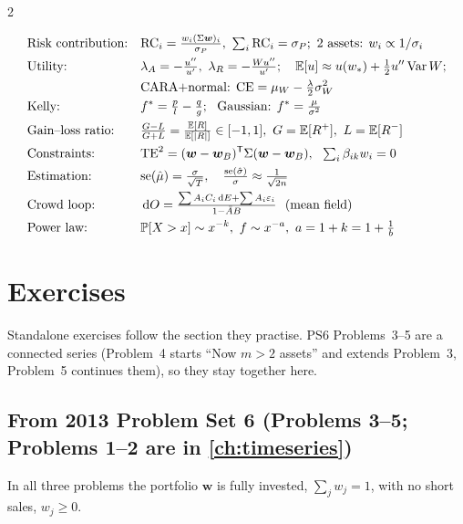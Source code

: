 \begin{paracol}{2}
\begin{keyformulas}
\begin{align*}
&\text{Risk contribution:} && \mathrm{RC}_i=\tfrac{w_i(\Sigma\bm w)_i}{\sigma_P},\ \textstyle\sum_i\mathrm{RC}_i=\sigma_P;\ \text{2 assets: }w_i\propto1/\sigma_i\\
&\text{Utility:} && \lambda_A=-\tfrac{u''}{u'},\ \lambda_R=-\tfrac{Wu''}{u'};\quad \E[u]\approx u(w_*)+\tfrac12u''\Var W;\\
& && \text{CARA+normal: CE}=\mu_W-\tfrac\lambda2\sigma_W^2\\
&\text{Kelly:} && f^*=\tfrac pl-\tfrac qg;\ \ \text{Gaussian: }f^*=\tfrac{\mu}{\sigma^2}\\
&\text{Gain--loss ratio:} && \tfrac{G-L}{G+L}=\tfrac{\E[R]}{\E[|R|]}\in[-1,1],\ G=\E[R^+],\ L=\E[R^-]\\
&\text{Constraints:} && \mathrm{TE}^2=(\bm w-\bm w_B)\T\Sigma(\bm w-\bm w_B),\ \ \textstyle\sum_i\beta_{ik}w_i=0\\
&\text{Estimation:} && \mathrm{se}(\hat\mu)=\tfrac\sigma{\sqrt T},\quad \tfrac{\mathrm{se}(\hat\sigma)}\sigma\approx\tfrac1{\sqrt{2n}}\\
&\text{Crowd loop:} && \dd O=\tfrac{\sum A_iC_i\dd E+\sum A_i\varepsilon_i}{1-\bar AB}\ \ (\text{mean field})\\
&\text{Power law:} && \Prob[X>x]\sim x^{-k},\ f\sim x^{-a},\ a=1+k=1+\tfrac1b
\end{align*}
\end{keyformulas}

\section*{Exercises}
Standalone exercises follow the section they practise. PS6 Problems~3--5 are a connected series (Problem~4 starts ``Now $m>2$ assets'' and extends Problem~3, Problem~5 continues them), so they stay together here.

\subsection*{From 2013 Problem Set 6 (Problems 3--5; Problems 1--2 are in \cref{ch:timeseries})}
In all three problems the portfolio $\bm w$ is fully invested, $\sum_jw_j=1$, with no short sales, $w_j\ge0$.


\end{paracol}
